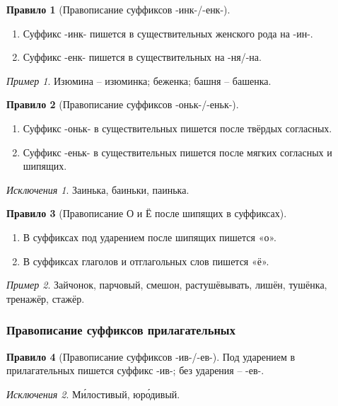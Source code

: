 \documentclass[12pt]{article}
\theoremstyle{definition}
\newtheorem{rrule}{Правило}[section]
\theoremstyle{remark}
\newtheorem*{example}{Пример}
\newtheorem*{exception}{Исключения}
\begin{document}
\begin{rrule}[Правописание суффиксов -инк-/-енк-]
    \hfill
    \begin{enumerate}
        \item Суффикс -инк- пишется в существительных женского рода на -ин-.
        \item Суффикс -енк- пишется в существительных на -ня/-на. 
    \end{enumerate}
    \begin{example}
        Изюмина -- изюминка; беженка; башня -- башенка.
    \end{example}
\end{rrule}

\begin{rrule}[Правописание суффиксов -оньк-/-еньк-]
    \hfill
    \begin{enumerate}
        \item Суффикс -оньк- в существительных пишется после твёрдых согласных.
        \item Суффикс -еньк- в существительных пишется после мягких согласных и шипящих. 
    \end{enumerate}
    \begin{exception}
        Заинька, баиньки, паинька.
    \end{exception}
\end{rrule}

\begin{rrule}[Правописание О и Ё после шипящих в суффиксах]
    \hfill
    \begin{enumerate}
        \item В суффиксах под ударением после шипящих пишется «о».
        \item В суффиксах глаголов и отглагольных слов пишется «ё».
    \end{enumerate}
    \begin{example}
        Зайчонок, парчовый, смешон, растушёвывать, лишён, тушёнка, тренажёр, стажёр.
    \end{example}
\end{rrule}

\subsubsection{Правописание суффиксов прилагательных}

\begin{rrule}[Правописание суффиксов -ив-/-ев-]
    Под ударением в прилагательных пишется суффикс -ив-; без ударения – -ев-.
    \begin{exception}
        М\'{и}лостивый, юр\'{о}дивый.
    \end{exception}
\end{rrule}
\end{document}
